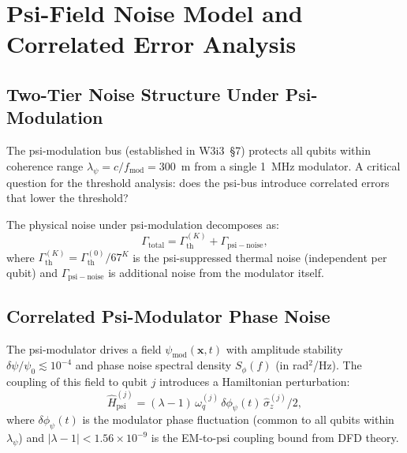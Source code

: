 \documentclass[11pt]{article}
\theoremstyle{definition}
\theoremstyle{remark}
\begin{document}
\section{Psi-Field Noise Model and Correlated Error Analysis}
\label{sec:noise-model}

\subsection{Two-Tier Noise Structure Under Psi-Modulation}
\label{sec:two-tier-noise}

The psi-modulation bus (established in W3i3~\S7) protects all qubits
within coherence range $\lambda_\psi = c/f_{\mathrm{mod}} = 300$~m from a
single 1~MHz modulator.  A critical question for the threshold analysis:
does the psi-bus introduce correlated errors that lower the threshold?

The physical noise under psi-modulation decomposes as:
\begin{equation}
  \Gamma_{\mathrm{total}} = \Gamma_{\mathrm{th}}^{(K)} + \Gamma_{\mathrm{psi-noise}},
  \label{eq:total-rate}
\end{equation}
where $\Gamma_{\mathrm{th}}^{(K)} = \Gamma_{\mathrm{th}}^{(0)}/67^K$ is the
psi-suppressed thermal noise (independent per qubit) and $\Gamma_{\mathrm{psi-noise}}$
is additional noise from the modulator itself.

\subsection{Correlated Psi-Modulator Phase Noise}
\label{sec:correlated-noise}

The psi-modulator drives a field $\psi_{\mathrm{mod}}(\mathbf{x}, t)$ with
amplitude stability $\delta\psi/\psi_0 \lesssim 10^{-4}$ and phase noise
spectral density $S_\phi(f)$ (in rad$^2$/Hz).  The coupling of this field
to qubit $j$ introduces a Hamiltonian perturbation:
\begin{equation}
  \hat{H}_{\mathrm{psi}}^{(j)} = (\lambda - 1)\,\omega_q^{(j)}\,\delta\phi_\psi(t)\,\hat{\sigma}_z^{(j)}/2,
  \label{eq:psi-qubit-coupling}
\end{equation}
where $\delta\phi_\psi(t)$ is the modulator phase fluctuation (common to all
qubits within $\lambda_\psi$) and $|\lambda - 1| < 1.56\times10^{-9}$ is the
EM-to-psi coupling bound from DFD theory.
\end{document}
